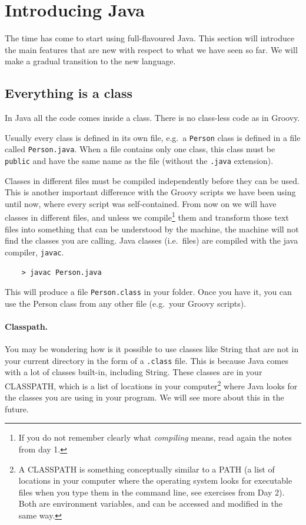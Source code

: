 
\section{Introducing Java}
\label{sec:introducing-java}

The time has come to start using full-flavoured Java. This section
will introduce the main features that are new with respect to what we
have seen so far. We will make a gradual transition to the new
language. 

\subsection{Everything is a class}
\label{sec:everything-class}

In Java all the code comes inside a class. There is no class-less
code as in Groovy. 

Usually every class is defined in its own file, e.g.~a \verb+Person+
class is defined in a file called \verb+Person.java+. When a file
contains only one class, this class must be \verb+public+ and have the same
name as the file (without the \verb+.java+ extension). 

Classes in different files must be compiled independently before they
can be used. This is another important difference with the Groovy
scripts we have been using until now, where every script was
self-contained. From now on we will have classes in different files,
and unless we compile\footnote{If you do not remember clearly what
  \emph{compiling} means, read again the notes from day 1. } them and
transform those text files into something that can be understood by
the machine, the machine will not find the classes you are
calling. Java classes (i.e.~files) are compiled with the java
compiler, \verb+javac+. 

\begin{verbatim}
    > javac Person.java
\end{verbatim}

This will produce a file \verb+Person.class+ in your folder. Once you
have it, you can use the Person class from any other file (e.g.~your
Groovy scripts). 

\paragraph{Classpath. }
\label{sec:classpath.-}

You may be wondering how is it possible to use classes like String
that are not in your current directory in the form of a \verb+.class+
file. This is because Java comes with a lot of classes built-in,
including String. These classes are in your CLASSPATH, which is a list
of locations in your computer\footnote{A CLASSPATH is something
  conceptually similar to a PATH (a list of locations in your computer
  where the operating system looks for executable files when you type
  them in the command line, see exercises from Day 2). 
  Both are environment variables, and can be
  accessed and modified in the same way.} where Java looks for the
classes you are using in your program. We will see more about this in
the future.

